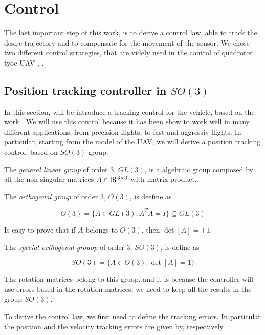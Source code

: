 \chapter{Control}
\label{control}

The last important step of this work, is to derive a control law, able to track the desire trajectory and to compensate for the movement of the sensor. We chose two different control strategies, that are videly used in the control of quadrotor tyoe UAV \cite{LeeController}, \cite{MPCGeorge}.

\section{Position tracking controller in \texorpdfstring{$SO(3)$}{TEXT}}

In this section, will be introduce a tracking control for the vehicle, based on the work \cite{LeeController}. We will use this control because it has been show to work well in many different applications, from precision flights, to fast and aggressiv flights. In particular, starting from the model of the UAV, we will derive a position tracking control, based on $SO(3)$ group.

\noindent The \textit{general linear group} of order $3$, $GL(3)$, is a algebraic group composed by all the non singular matrices $A \in \rm I\!R^{3\times 3}$ with matrix product.

\noindent The \textit{orthogonal group} of order $3$, $O(3)$, is deefine as

\begin{equation*}
	O(3) = \{A \in GL(3) : A^TA=I \} \subseteq GL(3)
\end{equation*}

\noindent Is easy to prove that if $A$ belongs to $O(3)$, then $\det[A]=\pm 1$.

\noindent The \textit{special orthogonal grouop} of order $3$, $SO(3)$, is define as

\begin{equation*}
	SO(3) = \{A \in O(3) : \det[A] = 1\} 
\end{equation*}

\noindent The rotation matrices belong to this gruop, and it is because the controller will use errors based in the rotation matrices, we need to keep all the results in the group $SO(3)$.

\noindent To derive the control law, we first need to define the tracking errors. In particular the position and the velocity tracking errors are given by, respectively

